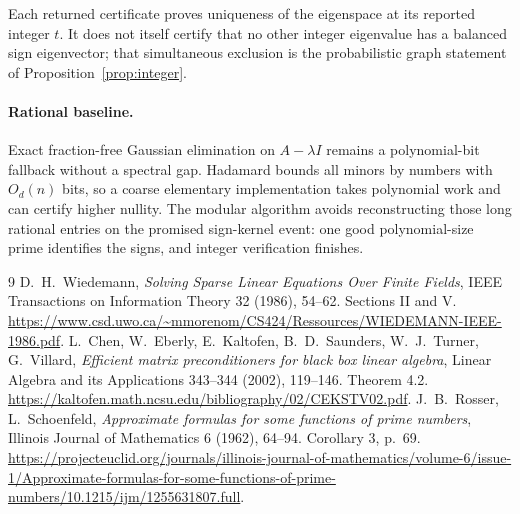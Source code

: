 \documentclass[11pt]{article}
\begin{document}
Each returned certificate proves uniqueness of the eigenspace at its
reported integer $t$. It does not itself certify that no other integer
eigenvalue has a balanced sign eigenvector; that simultaneous exclusion
is the probabilistic graph statement of Proposition~\ref{prop:integer}.

\paragraph{Rational baseline.}
Exact fraction-free Gaussian elimination on $A-\lambda I$ remains
a polynomial-bit fallback without a spectral gap. Hadamard bounds
all minors by numbers with $O_d(n)$ bits, so a coarse elementary
implementation takes polynomial work and can certify higher nullity.
The modular algorithm avoids reconstructing those long rational
entries on the promised sign-kernel event: one good polynomial-size
prime identifies the signs, and integer verification finishes.

\begin{thebibliography}{9}
 D.~H.~Wiedemann,
\emph{Solving Sparse Linear Equations Over Finite Fields},
IEEE Transactions on Information Theory 32 (1986), 54--62.
Sections II and V.
\url{https://www.csd.uwo.ca/~mmorenom/CS424/Ressources/WIEDEMANN-IEEE-1986.pdf}.
 L.~Chen, W.~Eberly, E.~Kaltofen, B.~D.~Saunders,
W.~J.~Turner, G.~Villard,
\emph{Efficient matrix preconditioners for black box linear algebra},
Linear Algebra and its Applications 343--344 (2002), 119--146.
Theorem 4.2.
\url{https://kaltofen.math.ncsu.edu/bibliography/02/CEKSTV02.pdf}.
 J.~B.~Rosser, L.~Schoenfeld,
\emph{Approximate formulas for some functions of prime numbers},
Illinois Journal of Mathematics 6 (1962), 64--94.
Corollary 3, p.~69.
\url{https://projecteuclid.org/journals/illinois-journal-of-mathematics/volume-6/issue-1/Approximate-formulas-for-some-functions-of-prime-numbers/10.1215/ijm/1255631807.full}.
\end{thebibliography}
\end{document}
